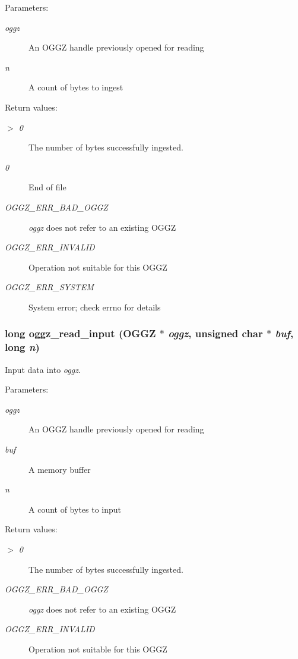 \begin{Desc}
\item[Parameters:]
\begin{description}
\item[{\em oggz}]An OGGZ handle previously opened for reading \item[{\em n}]A count of bytes to ingest \end{description}
\end{Desc}
\begin{Desc}
\item[Return values:]
\begin{description}
\item[{\em $>$  0}]The number of bytes successfully ingested. \item[{\em 0}]End of file \item[{\em OGGZ\_\-ERR\_\-BAD\_\-OGGZ}]{\em oggz\/} does not refer to an existing OGGZ \item[{\em OGGZ\_\-ERR\_\-INVALID}]Operation not suitable for this OGGZ \item[{\em OGGZ\_\-ERR\_\-SYSTEM}]System error; check errno for details \end{description}
\end{Desc}
\subsubsection{\setlength{\rightskip}{0pt plus 5cm}long oggz\_\-read\_\-input ({\bf OGGZ} $\ast$ {\em oggz}, unsigned char $\ast$ {\em buf}, long {\em n})}\label{group__read__api_ga3}


Input data into {\em oggz\/}. 

\begin{Desc}
\item[Parameters:]
\begin{description}
\item[{\em oggz}]An OGGZ handle previously opened for reading \item[{\em buf}]A memory buffer \item[{\em n}]A count of bytes to input \end{description}
\end{Desc}
\begin{Desc}
\item[Return values:]
\begin{description}
\item[{\em $>$  0}]The number of bytes successfully ingested. \item[{\em OGGZ\_\-ERR\_\-BAD\_\-OGGZ}]{\em oggz\/} does not refer to an existing OGGZ \item[{\em OGGZ\_\-ERR\_\-INVALID}]Operation not suitable for this OGGZ \end{description}
\end{Desc}
